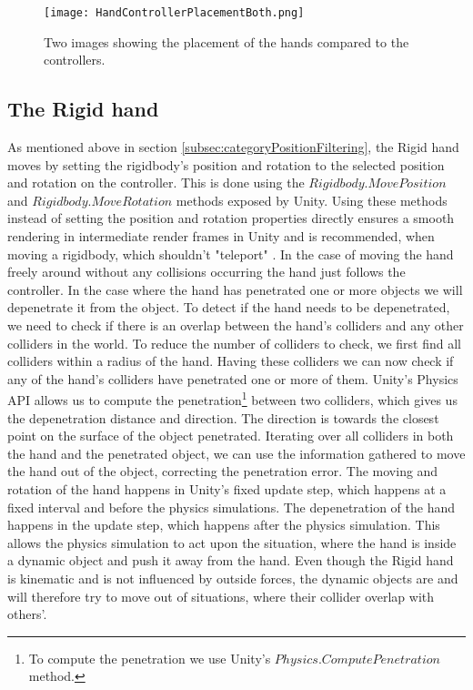 \begin{figure}[h]
\centering
\texttt{[image: HandControllerPlacementBoth.png]}
\caption{Two images showing the placement of the hands compared to the controllers.}
\label{fig:handControllerPlacement}
\end{figure}


\subsection{The Rigid hand}
\label{subsec:rigidHand}
As mentioned above in section \ref{subsec:categoryPositionFiltering}, the Rigid hand moves by setting the rigidbody's position and rotation to the selected position and rotation on the controller. This is done using the $Rigidbody.MovePosition$ and $Rigidbody.MoveRotation$ methods exposed by Unity. Using these methods instead of setting the position and rotation properties directly ensures a smooth rendering in intermediate render frames in Unity and is recommended, when moving a rigidbody, which shouldn't "teleport" \parencite{UnityMovePosition2017}. In the case of moving the hand freely around without any collisions occurring the hand just follows the controller. In the case where the hand has penetrated one or more objects we will depenetrate it from the object. To detect if the hand needs to be depenetrated, we need to check if there is an overlap between the hand's colliders and any other colliders in the world. To reduce the number of colliders to check, we first find all colliders within a radius of the hand. Having these colliders we can now check if any of the hand's colliders have penetrated one or more of them. Unity's Physics API allows us to compute the penetration\footnote{To compute the penetration we use Unity's $Physics.ComputePenetration$ method.} between two colliders, which gives us the depenetration distance and direction. The direction is towards the closest point on the surface of the object penetrated. Iterating over all colliders in both the hand and the penetrated object, we can use the information gathered to move the hand out of the object, correcting the penetration error. The moving and rotation of the hand happens in Unity's fixed update step, which happens at a fixed interval and before the physics simulations. The depenetration of the hand happens in the update step, which happens after the physics simulation. This allows the physics simulation to act upon the situation, where the hand is inside a dynamic object and push it away from the hand. Even though the Rigid hand is kinematic and is not influenced by outside forces, the dynamic objects are and will therefore try to move out of situations, where their collider overlap with others'.

